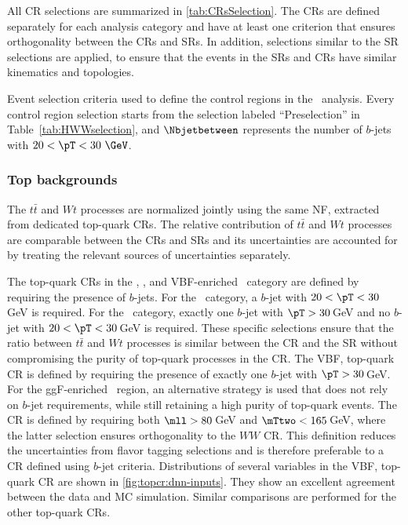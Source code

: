 All CR selections are summarized in \cref{tab:CRsSelection}. 
The CRs are defined separately for each analysis category and have at least one criterion that ensures orthogonality between the CRs and SRs.
In addition, selections similar to the SR selections are applied, to ensure that the events in the SRs and CRs have similar kinematics and topologies. 
\begin{table}[!ht]
    \caption{
      Event selection criteria used to define the control regions in the \hwwenmn\ analysis.
      Every control region selection starts from the selection labeled ``Preselection'' in Table~\ref{tab:HWWselection}, and $\Nbjetbetween$ represents the number of $b$-jets with $20 < \pT < 30~\GeV$.}
  \label{tab:CRsSelection}
  \centering
  \resizebox{\textwidth}{!}{
  
  }
  \end{table}
\subsubsection{Top backgrounds}
The $t\bar{t}$ and $Wt$ processes are normalized jointly using the same NF, extracted from dedicated top-quark CRs.
The relative contribution of $t\bar{t}$ and $Wt$ processes are comparable between the CRs and SRs and its uncertainties are accounted for by treating the relevant sources of uncertainties separately.

The top-quark CRs in the \ZeroJet, \OneJet, and VBF-enriched \TwoJet\ category are defined by requiring the presence of $b$-jets.
For the \ZeroJet\ category, a $b$-jet with $20 < \pT < 30\,$GeV is required.
For the \OneJet\ category, exactly one $b$-jet with $\pT > 30\,$GeV and no $b$-jet with $20 < \pT < 30\,$GeV is required. These specific selections ensure that the ratio between $t\bar{t}$ and $Wt$ processes is similar between the CR and the SR without compromising the purity of top-quark processes in the CR.
The VBF, top-quark CR is defined by requiring the presence of exactly one $b$-jet with $\pT > 30\,$GeV.
For the ggF-enriched \TwoJet\ region, an alternative strategy is used that does not rely on $b$-jet requirements, while still retaining a high purity of top-quark events. The CR is defined by requiring both $\mll > 80\,$GeV and $\mTtwo < 165\,$GeV, where the latter selection ensures orthogonality to the $WW$ CR. This definition reduces the uncertainties from flavor tagging selections and is therefore preferable to a CR defined using $b$-jet criteria.
Distributions of several variables in the VBF, top-quark CR are shown in \cref{fig:topcr:dnn-inputs}. They show an excellent agreement between the data and MC simulation. Similar comparisons are performed for the other top-quark CRs.

